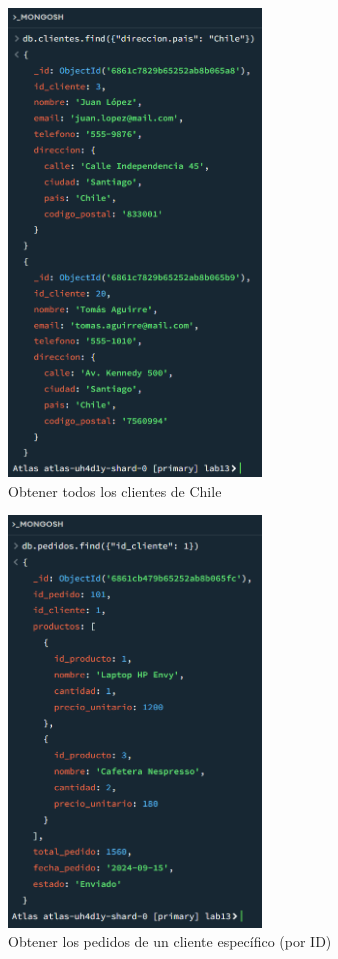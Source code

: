 \begin{figure}[H]
    \centering
    \includegraphics[width=0.6\textwidth]{./p1_chile.png}
    \caption{Obtener todos los clientes de Chile}\label{fig:chile}
\end{figure}

\begin{figure}[H]
    \centering
    \includegraphics[width=0.6\textwidth]{./p1_id.png}
    \caption{Obtener los pedidos de un cliente específico (por ID)}\label{fig:id}
\end{figure}

